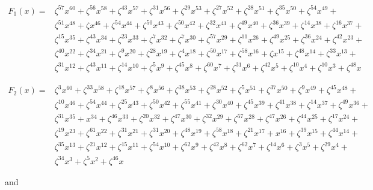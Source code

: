 \documentclass[10pt]{article}
\begin{document}
$$
\begin{aligned}
F_{1}(x)= & \zeta^{57} x^{60}+\zeta^{56} x^{58}+\zeta^{43} x^{57}+\zeta^{31} x^{56}+\zeta^{29} x^{53}+\zeta^{27} x^{52}+\zeta^{28} x^{51}+\zeta^{35} x^{50}+\zeta^{54} x^{49}+ \\
& \zeta^{51} x^{48}+\zeta x^{46}+\zeta^{54} x^{44}+\zeta^{50} x^{43}+\zeta^{50} x^{42}+\zeta^{32} x^{41}+\zeta^{49} x^{40}+\zeta^{36} x^{39}+\zeta^{14} x^{38}+\zeta^{16} x^{37}+ \\
& \zeta^{15} x^{35}+\zeta^{43} x^{34}+\zeta^{23} x^{33}+\zeta^{7} x^{32}+\zeta^{7} x^{30}+\zeta^{57} x^{29}+\zeta^{11} x^{26}+\zeta^{49} x^{25}+\zeta^{36} x^{24}+\zeta^{42} x^{23}+ \\
& \zeta^{40} x^{22}+\zeta^{34} x^{21}+\zeta^{9} x^{20}+\zeta^{28} x^{19}+\zeta^{4} x^{18}+\zeta^{50} x^{17}+\zeta^{58} x^{16}+\zeta x^{15}+\zeta^{48} x^{14}+\zeta^{33} x^{13}+ \\
& \zeta^{31} x^{12}+\zeta^{43} x^{11}+\zeta^{14} x^{10}+\zeta^{5} x^{9}+\zeta^{45} x^{8}+\zeta^{60} x^{7}+\zeta^{31} x^{6}+\zeta^{42} x^{5}+\zeta^{10} x^{4}+\zeta^{10} x^{3}+\zeta^{48} x
\end{aligned}
$$

$$
\begin{aligned}
F_{2}(x)= & \zeta^{3} x^{60}+\zeta^{33} x^{58}+\zeta^{18} x^{57}+\zeta^{8} x^{56}+\zeta^{38} x^{53}+\zeta^{28} x^{52}+\zeta^{5} x^{51}+\zeta^{37} x^{50}+\zeta^{9} x^{49}+\zeta^{45} x^{48}+ \\
& \zeta^{10} x^{46}+\zeta^{54} x^{44}+\zeta^{25} x^{43}+\zeta^{50} x^{42}+\zeta^{55} x^{41}+\zeta^{30} x^{40}+\zeta^{45} x^{39}+\zeta^{41} x^{38}+\zeta^{14} x^{37}+\zeta^{49} x^{36}+ \\
& \zeta^{31} x^{35}+x^{34}+\zeta^{46} x^{33}+\zeta^{20} x^{32}+\zeta^{47} x^{30}+\zeta^{32} x^{29}+\zeta^{57} x^{28}+\zeta^{47} x^{26}+\zeta^{44} x^{25}+\zeta^{17} x^{24}+ \\
& \zeta^{19} x^{23}+\zeta^{61} x^{22}+\zeta^{31} x^{21}+\zeta^{31} x^{20}+\zeta^{48} x^{19}+\zeta^{58} x^{18}+\zeta^{21} x^{17}+x^{16}+\zeta^{39} x^{15}+\zeta^{44} x^{14}+ \\
& \zeta^{35} x^{13}+\zeta^{21} x^{12}+\zeta^{15} x^{11}+\zeta^{54} x^{10}+\zeta^{62} x^{9}+\zeta^{42} x^{8}+\zeta^{62} x^{7}+\zeta^{14} x^{6}+\zeta^{3} x^{5}+\zeta^{29} x^{4}+ \\
& \zeta^{34} x^{3}+\zeta^{5} x^{2}+\zeta^{46} x
\end{aligned}
$$

and
\end{document}

